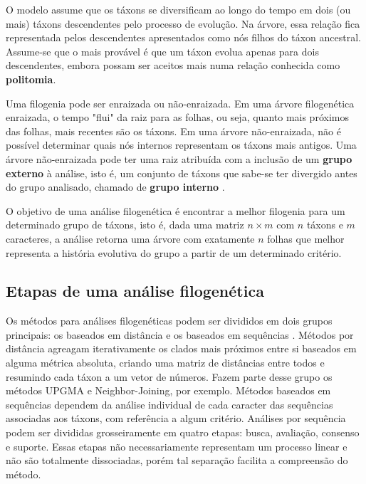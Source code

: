 \documentclass[12pt]{article}
\begin{document}
O modelo assume que os táxons se diversificam ao longo do tempo em dois (ou mais) táxons descendentes pelo processo de evolução. Na árvore, essa relação fica representada pelos descendentes apresentados como nós filhos do táxon ancestral. Assume-se que o mais provável é que um táxon evolua apenas para dois descendentes, embora possam ser aceitos mais numa relação conhecida como \textbf{politomia}.

Uma filogenia pode ser enraizada ou não-enraizada. Em uma árvore filogenética enraizada, o tempo "flui" da raiz para as folhas, ou seja, quanto mais próximos das folhas, mais recentes são os táxons. Em uma árvore não-enraizada, não é possível determinar quais nós internos representam os táxons mais antigos. Uma árvore não-enraizada pode ter uma raiz atribuída com a inclusão de um \textbf{grupo externo} à análise, isto é, um conjunto de táxons que sabe-se ter divergido antes do grupo analisado, chamado de \textbf{grupo interno} \cite{felsenstein2004inferring}.

O objetivo de uma análise filogenética é encontrar a melhor filogenia para um determinado grupo de táxons, isto é, dada uma matriz $n \times m$ com $n$ táxons e $m$ caracteres, a análise retorna uma árvore com exatamente $n$ folhas que melhor representa a história evolutiva do grupo a partir de um determinado critério.

\subsection{Etapas de uma análise filogenética}

Os métodos para análises filogenéticas podem ser divididos em dois grupos principais: os baseados em distância e os baseados em sequências \cite{cotta2002inferring}. Métodos por distância agreagam iterativamente os clados mais próximos entre si baseados em alguma métrica absoluta, criando uma matriz de distâncias entre todos e resumindo cada táxon a um vetor de números. Fazem parte desse grupo os métodos UPGMA e Neighbor-Joining, por exemplo. Métodos baseados em sequências dependem da análise individual de cada caracter das sequências associadas aos táxons, com referência a algum critério. Análises por sequência podem ser divididas grosseiramente em quatro etapas: busca, avaliação, consenso e suporte. Essas etapas não necessariamente representam um processo linear e não são totalmente dissociadas, porém tal separação facilita a compreensão do método.
\end{document}
